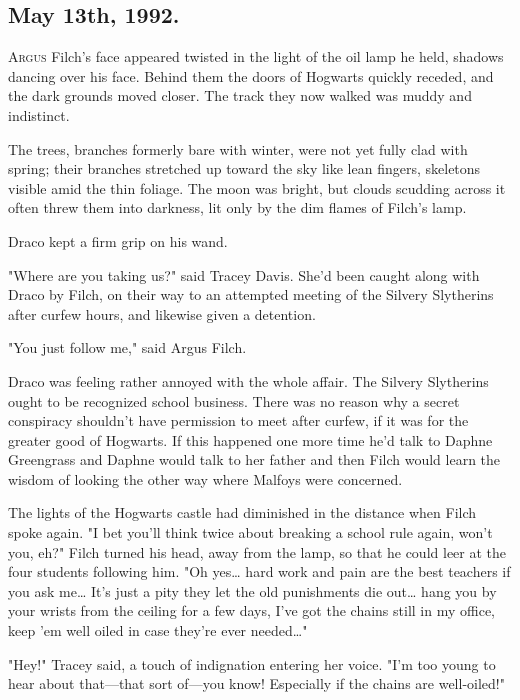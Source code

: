 
\subsection{May 13th, 1992.}

\lettrine{A}{rgus} Filch's face appeared twisted in the light of the oil lamp he held,
shadows dancing over his face. Behind them the doors of Hogwarts quickly
receded, and the dark grounds moved closer. The track they now walked was muddy
and indistinct.

The trees, branches formerly bare with winter, were not yet fully clad with
spring; their branches stretched up toward the sky like lean fingers, skeletons
visible amid the thin foliage. The moon was bright, but clouds scudding across
it often threw them into darkness, lit only by the dim flames of Filch's lamp.

Draco kept a firm grip on his wand.

"Where are you taking us?" said Tracey Davis. She'd been caught along with
Draco by Filch, on their way to an attempted meeting of the Silvery Slytherins
after curfew hours, and likewise given a detention.

"You just follow me," said Argus Filch.

Draco was feeling rather annoyed with the whole affair. The Silvery Slytherins
ought to be recognized school business. There was no reason why a secret
conspiracy shouldn't have permission to meet after curfew, if it was for the
greater good of Hogwarts. If this happened one more time he'd talk to Daphne
Greengrass and Daphne would talk to her father and then Filch would learn the
wisdom of looking the other way where Malfoys were concerned.

The lights of the Hogwarts castle had diminished in the distance when Filch
spoke again. "I bet you'll think twice about breaking a school rule again,
won't you, eh?" Filch turned his head, away from the lamp, so that he could
leer at the four students following him. "Oh yes{\ldots} hard work and pain are
the best teachers if you ask me{\ldots} It's just a pity they let the old
punishments die out{\ldots} hang you by your wrists from the ceiling for a few
days, I've got the chains still in my office, keep 'em well oiled in case
they're ever needed{\ldots}"

"Hey!" Tracey said, a touch of indignation entering her voice. "I'm too young
to hear about that---that sort of---you know! Especially if the chains are
well-oiled!"

